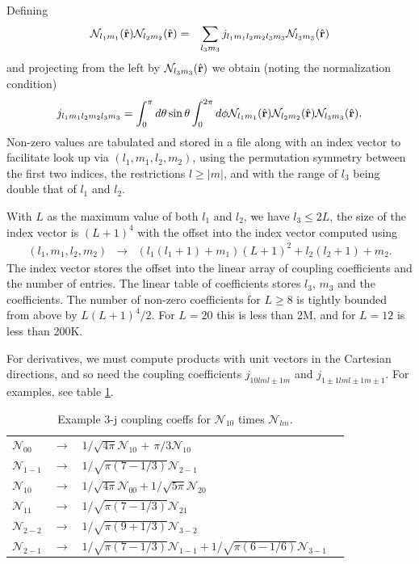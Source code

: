 \documentclass[12pt]{article}
\newcommand{\N}{\mathcal{N}}
\newcommand{\rv}{\vb{r}}
\newcommand{\rhat}{\hat{\rv}}
\begin{document}
Defining 
\begin{eqnarray}
  \N_{l_1 m_1}(\rhat) \N_{l_2 m_2}(\rhat) & = & \sum_{l_3 m_3} j_{l_1 m_1 l_2 m_2 l_3 m_3} \N_{l_3 m_3}(\rhat)
\end{eqnarray}
and projecting from the left by $\N_{l_3 m_3}(\rhat)$ we obtain (noting the normalization condition)
\begin{eqnarray}
  j_{l_1 m_1 l_2 m_2 l_3 m_3} = \int_0^\pi d\theta \sin \theta \int_0^{2 \pi} d\phi \N_{l_1 m_1}(\rhat) \N_{l_2 m_2}(\rhat) \N_{l_3 m_3}(\rhat) .
\end{eqnarray}
Non-zero values are tabulated and stored in a file along with an index vector to facilitate look up via $(l_1, m_1, l_2, m_2)$, using the permutation symmetry between the first two indices, the restrictions $l \ge |m|$, and with the range of $l_3$ being double that of $l_1$ and $l_2$.

With $L$ as the maximum value of both $l_1$ and $l_2$, we have $l_3 \le 2 L$, the size of the index vector is $(L+1)^4$ with the offset into the index vector computed using
\begin{eqnarray}
  (l_1, m_1, l_2, m_2) & \rightarrow & (l_1 (l_1+1)+m_1) (L+1)^2 + l_2 (l_2+1)+m_2 .
\end{eqnarray}
The index vector stores the offset into the linear array of coupling coefficients and the number of entries.  The linear table of coefficients stores $l_3$, $m_3$ and the coefficients.
The number of non-zero coefficients for $L \ge 8$ is tightly bounded from above by $L (L+1)^4 / 2$. For $L=20$ this is less than 2M, and for $L=12$ is less than 200K.

For derivatives, we must compute products with unit vectors in the Cartesian directions, and so need the coupling coefficients $j_{1 0 l m l\pm 1 m}$ and $j_{1 \pm 1 l m l\pm 1 m\pm 1}$.  For examples, see table \ref{tab:3j10}.
\begin{table}
  \caption{Example 3-j coupling coeffs for $\N_{10}$ times $\N_{lm}$.} \label{tab:3j10}
  \begin{center}    
  \begin{tabular}{lcll}
$\N_{00}$  &   $\rightarrow$ &  $ 1/\sqrt{4 \pi} \N_{10} $ +  $\pi/3 \N_{10}$\\
$\N_{1 -1}$&   $\rightarrow$ &  $1/\sqrt{\pi (7-1/3)} \N_{2 -1}$  \\
$\N_{10}$ & $\rightarrow$ &  $1/\sqrt{4 \pi}  \N_{0 0} +   1/\sqrt{5 \pi} \N_{2 0}$ \\
$\N_{11}$ &  $\rightarrow$ &   $1/\sqrt{\pi (7-1/3)} \N_{2 1}$ \\
$\N_{2-2}$& $\rightarrow$ &  $1/\sqrt{\pi (9+1/3)} \N_{3 -2}$ \\
$\N_{2-1}$& $\rightarrow$ &  $1/\sqrt{\pi (7-1/3)} \N_{1 -1} +  1/\sqrt{\pi (6-1/6)} \N_{3 -1} $
  \end{tabular}
  \end{center}
\end{table}
\end{document}
